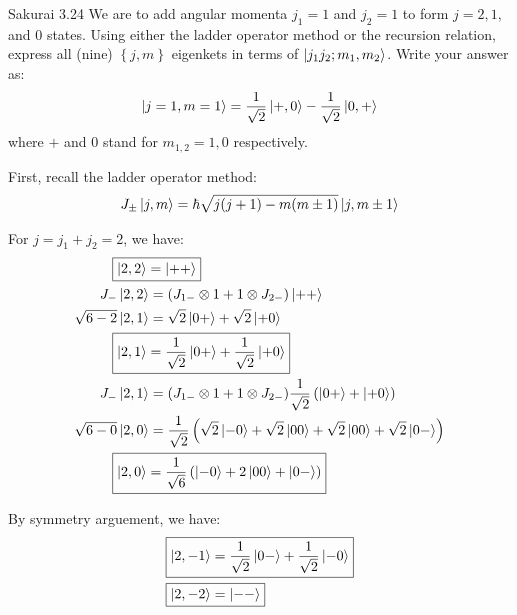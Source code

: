 \documentclass{article}
\begin{document}
\newpage
\begin{section}{Sakurai 3.24}
We are to add angular momenta $j_1 = 1$ and $j_2 = 1$ to form $j = 2, 1,$ and $0$ states. Using either the ladder operator method or the recursion relation, express all (nine) $\left\{ j,m \right\}$ eigenkets in terms of $\ket{j_1j_2;m_1,m_2}$. Write your answer as:
$$
	\ket{j=1,m=1} = \frac{1}{\sqrt{2}}\ket{+,0} - \frac{1}{\sqrt{2}}\ket{0,+}
$$
where $+$ and $0$ stand for $m_{1,2} = 1, 0$ respectively.

\begin{tcolorbox}[breakable]
	First, recall the ladder operator method:
	\begin{align*}
		J_\pm \ket{j,m} = \hbar \sqrt{j(j+1) - m(m\pm 1)} \ket{j,m\pm 1}
	\end{align*}

	For $j = j_1 + j_2 = 2$, we have:
	\begin{align*}
		\Aboxed{\ket{2,2}    & = \ket{++}}                                                                                                      \\
		J_- \ket{2,2}        & = (J_{1-} \otimes 1 + 1 \otimes J_{2-}) \ket{++}                                                                 \\
		\sqrt{6-2} \ket{2,1} & = \sqrt{2} \ket{0+} + \sqrt{2} \ket{+0}                                                                          \\
		\Aboxed{\ket{2,1}    & = \frac{1}{\sqrt{2}} \ket{0+} + \frac{1}{\sqrt{2}} \ket{+0}}                                                     \\
		J_- \ket{2,1}        & = (J_{1-} \otimes 1 + 1 \otimes J_{2-})  \frac{1}{\sqrt{2}} \left( \ket{0+} + \ket{+0} \right)                   \\
		\sqrt{6-0} \ket{2,0} & = \frac{1}{\sqrt{2}}\left( \sqrt{2} \ket{-0} + \sqrt{2} \ket{00} + \sqrt{2} \ket{00} + \sqrt{2} \ket{0-} \right) \\
		\Aboxed{\ket{2,0}    & = \frac{1}{\sqrt{6}}\left( \ket{-0} + 2\ket{00} + \ket{0-} \right)}
	\end{align*}

	By symmetry arguement, we have:
	\begin{align*}
		\Aboxed{\ket{2,-1} & = \frac{1}{\sqrt{2}} \ket{0-} + \frac{1}{\sqrt{2}} \ket{-0}} \\
		\Aboxed{\ket{2,-2} & = \ket{--}}
	\end{align*}


\end{tcolorbox}
\end{section}
\end{document}
